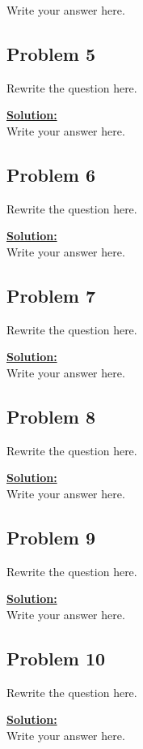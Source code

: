 \documentclass[letterpaper, 11pt, reqno]{amsart}
\begin{document}
%
Write your answer here.

\subsection*{Problem 5}

%
Rewrite the question here.

\vspace{0.1cm}
\noindent
\underline{\textbf{Solution:}} \\

%
Write your answer here.

\subsection*{Problem 6}

%
Rewrite the question here.

\vspace{0.1cm}
\noindent
\underline{\textbf{Solution:}} \\

%
Write your answer here.

\subsection*{Problem 7}

%
Rewrite the question here.

\vspace{0.1cm}
\noindent
\underline{\textbf{Solution:}} \\

%
Write your answer here.

\subsection*{Problem 8}

%
Rewrite the question here.

\vspace{0.1cm}
\noindent
\underline{\textbf{Solution:}} \\

%
Write your answer here.

\subsection*{Problem 9}

%
Rewrite the question here.

\vspace{0.1cm}
\noindent
\underline{\textbf{Solution:}} \\

%
Write your answer here.

\subsection*{Problem 10}

%
Rewrite the question here.

\vspace{0.1cm}
\noindent
\underline{\textbf{Solution:}} \\

%
Write your answer here.
\end{document}
